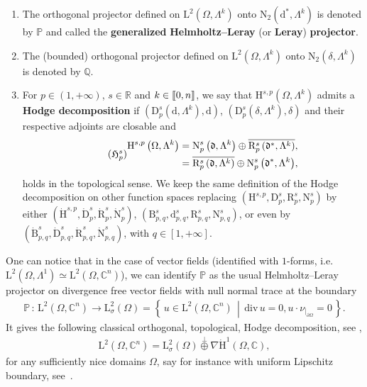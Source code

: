 \documentclass[AHL,Unicode,longabstracts,published]{cedram}
\renewcommand*{\div}{\mathrm{div\,}}
\newcommand{\bbP}{\mathbb{P}}
\newcommand{\bbR}{\mathbb{R}}
\newcommand{\bbC}{\mathbb{C}}
\newcommand{\bbQ}{\mathbb{Q}}
\newcommand{\rmH}{\mathrm{H}}%
\newcommand{\rmB}{\mathrm{B}}
\newcommand{\rmd}{\mathrm{d}}
\newcommand{\rmD}{\mathrm{D}}
\newcommand{\rmL}{\mathrm{L}}
\newcommand{\rmR}{\mathrm{R}}
\newcommand{\rmN}{\mathrm{N}}
\newcommand{\fkd}{\mathfrak{d}}
\newcommand{\llbracket}{\mathopen{[\mkern -2.7mu[}}
\newcommand{\rrbracket}{\mathclose{]\mkern -2.7mu]}}
\newcommand{\llb}{\llbracket}
\newcommand{\rrb}{\rrbracket}
\newcommand*{\romanenumi}{\renewcommand*{\theenumi}{\roman{enumi}}}
\begin{document}
\begin{defi}\leavevmode
\begin{enumerate}\romanenumi
\item\label{defi2.4.1} The orthogonal projector defined on $\rmL^2(\Omega,\Lambda^k)$ onto $\rmN _2(\rmd^\ast,\Lambda^k)$ is denoted by $\bbP$ and called the \textbf{generalized} \textbf{Helmholtz}\textbf{--}\textbf{Leray} (or \textbf{Leray}) \textbf{projector}.
\item\label{defi2.4.2} The (bounded) orthogonal projector defined on $\rmL^2(\Omega,\Lambda^k)$ onto $\rmN_2(\delta,\Lambda^k)$ is denoted by $\bbQ$.
\item\label{defi2.4.3} For $p\in(1,+\infty)$, $s\in\bbR$ and $k\in\llb 0,n\rrb$, we say that $\rmH^{s,p}(\Omega,\Lambda^k)$ admits a \textbf{Hodge decomposition} if $(\rmD_p^s(\rmd,\Lambda^k),\rmd)$, $(\rmD_p^s(\delta,\Lambda^k),\delta)$ and their respective adjoints are closable and
\begin{equation}\label{HodgeDecompHsp}
\tag{$\mathfrak{H}_p^s$}
\begin{split}
\rmH^{s,p}\left(\Omega,\Lambda^k\right) &= \rmN_p^s\left(\fkd,\Lambda^k\right)\oplus \overline{\rmR_p^s\left(\fkd^\ast,\Lambda^k\right)},\\
&= \overline{\rmR _p^s\left(\fkd,\Lambda^k\right)} \oplus {\rmN_p^s\left(\fkd^\ast,\Lambda^k\right)},
\end{split}
\end{equation}
holds in the topological sense. We keep the same definition of the Hodge decomposition on other function spaces replacing $({\rmH}^{s,p},{\rmD}_p^s,{\rmR }_p^s,{\rmN }_p^s)$ by either $(\dot{\rmH}^{s,p},\dot{\rmD}_p^s,\dot{\rmR }_p^s,\dot{\rmN }_p^s)$, $({\rmB}^{s}_{p,q},{\rmd}_{p,q}^s,{\rmR }_{p,q}^s,{\rmN }_{p,q}^s)$, or even by $(\dot{\rmB}^{s}_{p,q},\dot{\rmD}_{p,q}^s,\dot{\rmR }_{p,q}^s,\dot{\rmN }_{p,q}^s)$, with $q\in[1,+\infty]$.
\end{enumerate}
\end{defi}

One can notice that in the case of vector fields (identified with $1$-forms, i.e. $\rmL^2(\Omega,\Lambda^1)\simeq \rmL^2(\Omega,\bbC^n)$), we can identify $\bbP$ as the usual Helmholtz--Leray projector on divergence free vector fields with null normal trace at the boundary
\begin{align*}
\bbP\,:\, \rmL^2\left(\Omega,\bbC^n\right) \longrightarrow \rmL^2_{\sigma}(\Omega)=
\left\{\, u\in \rmL^2\left(\Omega,\bbC^n\right)\,\middle|\, \div u = 0, u\cdot
\nu_{|_{\partial\Omega}} =0\,\right\}.
\end{align*}
It gives the following classical orthogonal, topological, Hodge decomposition, see \cite[Chapter~2,~Section~2.5]{SohrBook2001},
\begin{align*}
\rmL^2\left(\Omega,\bbC^n\right)= \rmL^2_{\sigma}(\Omega)\stackrel{\perp}{\oplus}\nabla \dot{\rmH}^1(\Omega,\bbC),
\end{align*}
for any sufficiently nice domains $\Omega$, say for instance with uniform Lipschitz boundary, see~\cite[Lemma~2.5.3]{SohrBook2001}.
\end{document}
